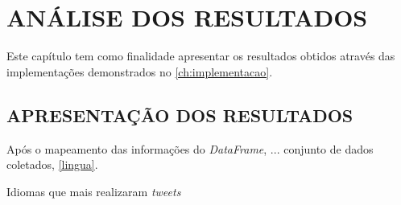 
\chapter{ANÁLISE DOS RESULTADOS}\label{ch:resultados}

Este capítulo tem como finalidade apresentar os resultados obtidos através das implementações demonstrados no \autoref{ch:implementacao}.

\section{APRESENTAÇÃO DOS RESULTADOS}

Após o mapeamento das informações do \textit{DataFrame},  ... conjunto de dados coletados, \autoref{lingua}.

\begin{grafico}[h]
	\centering
	\caption{Idiomas que mais realizaram \textit{tweets}}
	\label{lingua}
\end{grafico}









